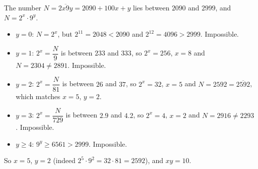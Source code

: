 The number $N=\overline{2x9y}=2090+100x+y$ lies between $2090$ and $2999$, and $N=2^x\cdot9^y$.
\begin{itemize}
\item $y=0$: $N=2^x$, but $2^{11}=2048<2090$ and $2^{12}=4096>2999$. Impossible.
\item $y=1$: $2^x=\dfrac N9$ is between $233$ and $333$, so $2^x=256$, $x=8$ and $N=2304\ne2891$. Impossible.
\item $y=2$: $2^x=\dfrac{N}{81}$ is between $26$ and $37$, so $2^x=32$, $x=5$ and $N=2592=\overline{2592}$, which matches $x=5$, $y=2$.
\item $y=3$: $2^x=\dfrac{N}{729}$ is between $2.9$ and $4.2$, so $2^x=4$, $x=2$ and $N=2916\ne2293$. Impossible.
\item $y\ge4$: $9^y\ge6561>2999$. Impossible.
\end{itemize}
So $x=5$, $y=2$ (indeed $2^5\cdot9^2=32\cdot81=2592$), and $xy=\boxed{10}$.
